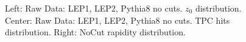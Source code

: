 \begin{figure}[H]
\centering
{}\hfill
{}\hfill %
\hfill %
\caption{Left: Raw Data: LEP1, LEP2, Pythia8 no cuts. $z_0$ distribution. Center: Raw Data: LEP1, LEP2, Pythia8 no cuts. TPC hits distribution. Right: NoCut rapidity distribution.}
\end{figure}

